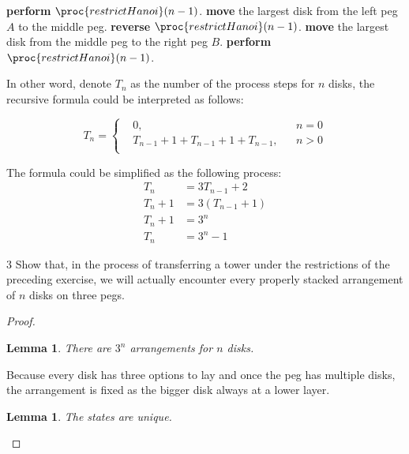 \documentclass[a4paper,12pt]{article}
\makeatletter
\newtheorem{lemma}[theorem]{Lemma}
\newtheorem*{solution}{Solution}
\theoremstyle{definition}
\renewenvironment{solution}[1][Solution] {\par\pushQED{\qed}\normalfont\topsep6\p@\@plus6\p@\relax\trivlist\item[\hskip\labelsep\bfseries#1\@addpunct{.}]\ignorespaces}{\popQED\endtrivlist\@endpefalse} \makeatother
\newenvironment{problems}{\begin{list}{}{\renewcommand{\makelabel}[1]{\textbf{##1}\hfil}}}{\end{list}}
\makeatother
\begin{document}
\begin{problems}
\begin{solution}
        \begin{codebox}
        \li \textbf{perform} $\proc{restrictHanoi}(n-1)$.
        \li \textbf{move} the largest disk from the left peg $A$ to the middle peg.
        \li \textbf{reverse} $\proc{restrictHanoi}(n-1)$.
        \li \textbf{move} the largest disk from the middle peg to the right peg $B$.
        \li \textbf{perform} $\proc{restrictHanoi}(n-1)$.
        \end{codebox}

        In other word, denote $T_n$ as the number of the process steps for $n$ disks, the recursive formula could be interpreted as follows:

        \begin{equation*}
            T_n = \left\{\begin{aligned}
               &0, && n=0\\
               &T_{n-1}+1+T_{n-1}+1+T_{n-1}, && n>0\\
            \end{aligned}\right.
        \end{equation*}

        The formula could be simplified as the following process:
        \begin{align*}
            T_n &= 3T_{n-1} + 2 \\
            T_n + 1 &= 3(T_{n-1}+1) \\
            T_n + 1 &= 3^n \\
            T_n &= 3^n -1 
        \end{align*}


    \end{solution}

    \item[3] Show that, in the process of transferring a tower under the restrictions of the preceding exercise, we will actually encounter every properly stacked arrangement of $n$ disks on three pegs.

    \begin{proof}
        \begin{lemma}\label{lem:count}
            There are $3^n$ arrangements for $n$ disks.
        \end{lemma}

        Because every disk has three options to lay and once the peg has multiple disks, the arrangement is fixed as the bigger disk always at a lower layer.

        \begin{lemma}\label{lem:unique}
            The states are unique.
        \end{lemma}


\end{proof}
\end{problems}
\end{document}
